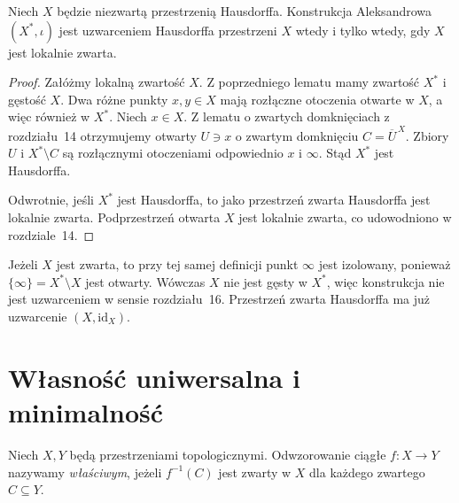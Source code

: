 \begin{twierdzenie}
\label{thm:topog-uzwarcenia-aleksandrow-kryterium}
Niech $X$ będzie niezwartą przestrzenią
Hausdorffa. Konstrukcja Aleksandrowa
$(X^\ast,\iota)$ jest uzwarceniem
Hausdorffa przestrzeni $X$
wtedy i tylko wtedy, gdy $X$
jest lokalnie zwarta.
\end{twierdzenie}
\begin{proof}
Załóżmy lokalną zwartość $X$.
Z poprzedniego lematu mamy
zwartość $X^\ast$ i gęstość $X$.
Dwa różne punkty $x,y\in X$
mają rozłączne otoczenia otwarte w $X$,
a więc również w $X^\ast$.
Niech $x\in X$.
Z lematu o zwartych domknięciach
z rozdziału~14 otrzymujemy otwarty
$U\ni x$ o zwartym domknięciu
$C=\overline U^{\,X}$.
Zbiory $U$ i $X^\ast\setminus C$
są rozłącznymi otoczeniami
odpowiednio $x$ i $\infty$.
Stąd $X^\ast$ jest Hausdorffa.

Odwrotnie, jeśli $X^\ast$ jest
Hausdorffa, to jako przestrzeń zwarta
Hausdorffa jest lokalnie zwarta.
Podprzestrzeń otwarta $X$
jest lokalnie zwarta,
co udowodniono w rozdziale~14.
\end{proof}

\begin{uwaga}
Jeżeli $X$ jest zwarta, to przy
tej samej definicji punkt $\infty$
jest izolowany, ponieważ
$\{\infty\}=X^\ast\setminus X$
jest otwarty. Wówczas $X$
nie jest gęsty w $X^\ast$,
więc konstrukcja nie jest
uzwarceniem w sensie rozdziału~16.
Przestrzeń zwarta Hausdorffa
ma już uzwarcenie $(X,\mathrm{id}_X)$.
\end{uwaga}

\section{Własność uniwersalna i minimalność}
\label{sec:topog-uzwarcenia-aleksandrow-uniwersalne}

\begin{definicja}
\label{def:topog-uzwarcenia-wlasciwe}
Niech $X,Y$ będą przestrzeniami
topologicznymi. Odwzorowanie ciągłe
$f\colon X\to Y$ nazywamy
\emph{właściwym}, jeżeli
$f^{-1}(C)$ jest zwarty w $X$
dla każdego zwartego $C\subseteq Y$.
\end{definicja}

